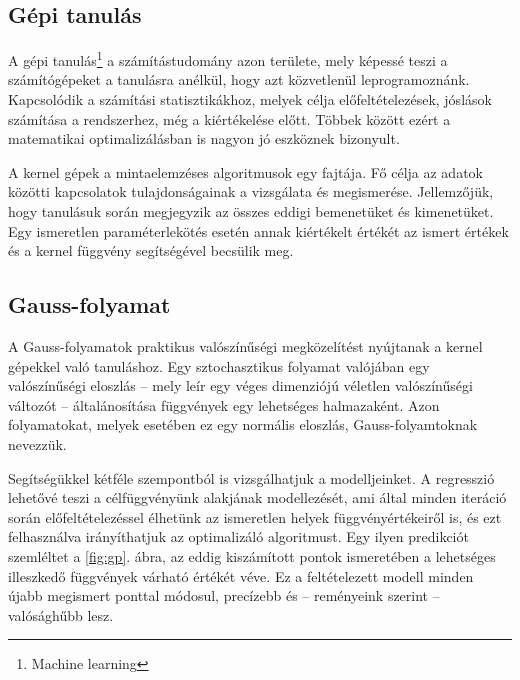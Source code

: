 \subsection{Gépi tanulás}

A gépi tanulás\footnote{Machine learning} a számítástudomány azon területe, mely képessé teszi a számítógépeket a tanulásra anélkül, hogy azt közvetlenül leprogramoznánk. Kapcsolódik a számítási statisztikákhoz, melyek célja előfeltételezések, jóslások számítása a rendszerhez, még a kiértékelése előtt. Többek között ezért a matematikai optimalizálásban is nagyon jó eszköznek bizonyult.

A kernel gépek a mintaelemzéses algoritmusok egy fajtája. Fő célja az adatok közötti kapcsolatok tulajdonságainak a vizsgálata és megismerése. Jellemzőjük, hogy tanulásuk során megjegyzik az összes eddigi bemenetüket és kimenetüket. Egy ismeretlen paraméterlekötés esetén annak kiértékelt értékét az ismert értékek és a kernel függvény segítségével becsülik meg.

\subsection{Gauss-folyamat}

A Gauss-folyamatok praktikus valószínűségi megközelítést nyújtanak a kernel gépekkel való tanuláshoz. Egy sztochasztikus folyamat valójában egy valószínűségi eloszlás -- mely leír egy véges dimenziójú véletlen valószínűségi változót -- általánosítása függvények egy lehetséges halmazaként. Azon folyamatokat, melyek esetében ez egy normális eloszlás, Gauss-folyamtoknak nevezzük.

Segítségükkel kétféle szempontból is vizsgálhatjuk a modelljeinket. A regresszió lehetővé teszi a célfüggvényünk alakjának modellezését, ami által minden iteráció során előfeltételezéssel élhetünk az ismeretlen helyek függvényértékeiről is, és ezt felhasználva irányíthatjuk az optimalizáló algoritmust. Egy ilyen predikciót szemléltet a \ref{fig:gp}. ábra, az eddig kiszámított pontok ismeretében a lehetséges illeszkedő függvények várható értékét véve. Ez a feltételezett modell minden újabb megismert ponttal módosul, precízebb és -- reményeink szerint -- valósághűbb lesz.

